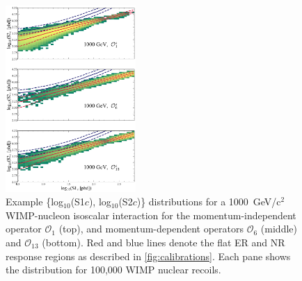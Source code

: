 \documentclass[reprint, showpacs,
preprintnumbers,
amsmath,amssymb,
aps, floatfix,
superscriptaddress,
prd, nofootinbib]{revtex4-1}
\begin{document}
\begin{figure}
    \centering
    \includegraphics[trim={8 5 5 5},clip, width=0.44\textwidth]{logx_logz_signals}
    \caption{Example \{log$_{10}$(S1$c$), log$_{10}$(S2$c$)\} distributions for a 1000~GeV/c$^2$ WIMP-nucleon isoscalar interaction for the momentum-independent operator $\mathcal{O}_1$ (top), and momentum-dependent operators $\mathcal{O}_6$ (middle) and $\mathcal{O}_{13}$ (bottom). 
    Red and blue lines denote the flat ER and NR response regions as described in \autoref{fig:calibrations}.
    Each pane shows the distribution for 100,000 WIMP nuclear recoils.
    }
    \label{fig:signal-PDF}
\end{figure}
\end{document}
